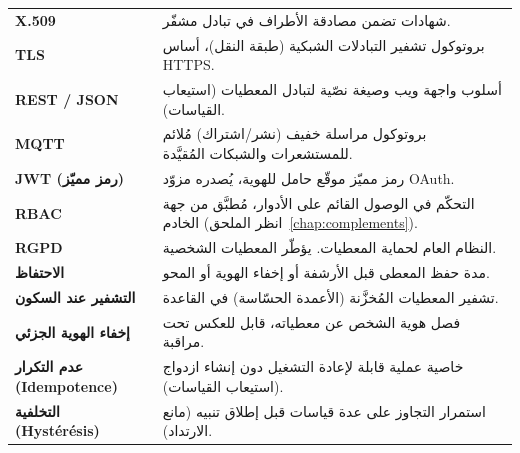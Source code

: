 \begin{xltabular}{\textwidth}{>{\bfseries}p{4cm} X}
X.509 & شهادات تضمن مصادقة الأطراف في تبادل مشفّر. \\
TLS & بروتوكول تشفير التبادلات الشبكية (طبقة النقل)، أساس HTTPS. \\
REST / JSON & أسلوب واجهة ويب وصيغة نصّية لتبادل المعطيات (استيعاب القياسات). \\
MQTT & بروتوكول مراسلة خفيف (نشر/اشتراك) مُلائم للمستشعرات والشبكات المُقيَّدة. \\
JWT (رمز مميّز) & رمز مميّز موقّع حامل للهوية، يُصدره مزوّد OAuth. \\
RBAC & التحكّم في الوصول القائم على الأدوار، مُطبَّق من جهة الخادم (انظر الملحق~\ref{chap:complements}). \\
RGPD & النظام العام لحماية المعطيات. يؤطّر المعطيات الشخصية. \\
الاحتفاظ & مدة حفظ المعطى قبل الأرشفة أو إخفاء الهوية أو المحو. \\
التشفير عند السكون & تشفير المعطيات المُخزَّنة (الأعمدة الحسّاسة) في القاعدة. \\
إخفاء الهوية الجزئي & فصل هوية الشخص عن معطياته، قابل للعكس تحت مراقبة. \\
عدم التكرار (Idempotence) & خاصية عملية قابلة لإعادة التشغيل دون إنشاء ازدواج (استيعاب القياسات). \\
التخلفية (Hystérésis) & استمرار التجاوز على عدة قياسات قبل إطلاق تنبيه (مانع الارتداد). \\
\bottomrule
\end{xltabular}
